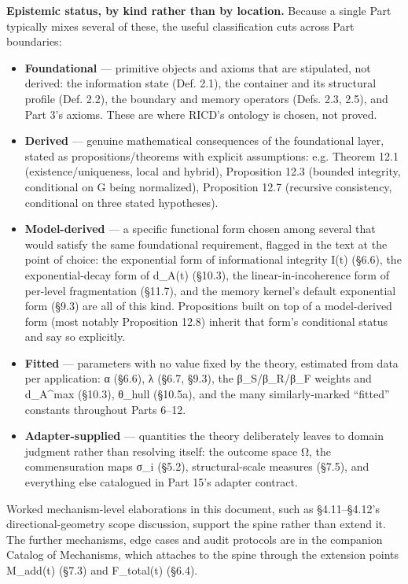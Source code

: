 \documentclass[
]{article}
\begin{document}
\textbf{Epistemic status, by kind rather than by location.} Because a
single Part typically mixes several of these, the useful classification
cuts across Part boundaries:

\begin{itemize}
\item
  \textbf{Foundational} --- primitive objects and axioms that are
  stipulated, not derived: the information state (Def. 2.1), the
  container and its structural profile (Def. 2.2), the boundary and
  memory operators (Defs. 2.3, 2.5), and Part 3's axioms. These are
  where RICD's ontology is chosen, not proved.
\item
  \textbf{Derived} --- genuine mathematical consequences of the
  foundational layer, stated as propositions/theorems with explicit
  assumptions: e.g. Theorem 12.1 (existence/uniqueness, local and
  hybrid), Proposition 12.3 (bounded integrity, conditional on G being
  normalized), Proposition 12.7 (recursive consistency, conditional on
  three stated hypotheses).
\item
  \textbf{Model-derived} --- a specific functional form chosen among
  several that would satisfy the same foundational requirement, flagged
  in the text at the point of choice: the exponential form of
  informational integrity I(t) (§6.6), the exponential-decay form of
  d\_A(t) (§10.3), the linear-in-incoherence form of per-level
  fragmentation (§11.7), and the memory kernel's default exponential
  form (§9.3) are all of this kind. Propositions built on top of a
  model-derived form (most notably Proposition 12.8) inherit that form's
  conditional status and say so explicitly.
\item
  \textbf{Fitted} --- parameters with no value fixed by the theory,
  estimated from data per application: α (§6.6), λ (§6.7, §9.3), the
  β\_S/β\_R/β\_F weights and d\_A\^{}max (§10.3), θ\_hull (§10.5a), and
  the many similarly-marked ``fitted'' constants throughout Parts 6--12.
\item
  \textbf{Adapter-supplied} --- quantities the theory deliberately
  leaves to domain judgment rather than resolving itself: the outcome
  space Ω, the commensuration maps σ\_i (§5.2), structural-scale
  measures (§7.5), and everything else catalogued in Part 15's adapter
  contract.
\end{itemize}

Worked mechanism-level elaborations in this document, such as
§4.11--§4.12's directional-geometry scope discussion, support the spine
rather than extend it. The further mechanisms, edge cases and audit
protocols are in the companion Catalog of Mechanisms, which attaches to
the spine through the extension points M\_add(t) (§7.3) and F\_total(t)
(§6.4).
\end{document}
